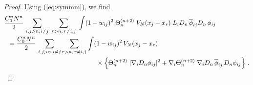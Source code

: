 \documentclass[11pt]{article}
\begin{document}
\begin{proof}
Using (\ref{eq:symmm}), we find
\begin{equation}\label{eq:Hk-2-1}
\begin{split}
&\frac{C_0^n N^n}{2} \, \sum_{i,j > n, i\neq j} \; \sum_{r>n, \, r
\neq i,j} \; \int (1-w_{ij})^2 \; \Theta^{(n+2)}_n \; V_N (x_j
-x_r)\; L_i D_n \, \overline{\phi}_{ij} D_n \, \phi_{ij}
\\
&\hspace{.2cm} = \frac{C_0^n N^n}{2} \, \sum_{i,j > n, i\neq j}
\sum_{r >n, \, r \neq i,j} \int (1- w_{ij})^2 \, V_N (x_j -x_r) \\
&\hspace{5cm} \times \left\{ \Theta^{(n+2)}_n \; |\nabla_i D_n
\phi_{ij}|^2 + \nabla_i \Theta^{(n+2)}_n \; \nabla_i D_n \,
\overline{\phi}_{ij} \, D_n \phi_{ij} \right\} \,.
\end{split}
\end{equation}


\end{proof}
\end{document}
